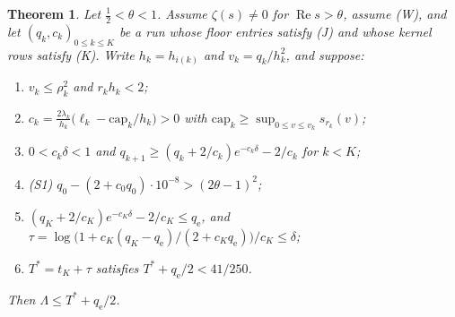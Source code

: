 \documentclass[11pt]{article}
\newtheorem{theorem}{Theorem}[section]
\theoremstyle{definition}
\newcommand{\LB}{\Lambda}
\newcommand{\capo}{\mathrm{cap}}
\newcommand{\qe}{q_{\mathrm e}}
\DeclareMathOperator{\Rea}{Re}
\begin{document}
\begin{theorem}\label{thm:barrier}
Let $\frac12<\theta<1$. Assume $\zeta(s)\ne0$ for $\Rea s>\theta$, assume \textup{(W)}, and
let $(q_k,c_k)_{0\le k\le K}$ be a run whose floor entries satisfy \textup{(J)} and whose
kernel rows satisfy \textup{(K)}. Write $h_k=h_{i(k)}$ and $v_k=q_k/h_k^2$, and suppose:
\begin{enumerate}[label=\textup{(C\arabic*)},leftmargin=3em]
\item $v_k\le\rho_k^2$ and $r_kh_k<2$;
\item $c_k=\frac{2\lambda_k}{h_k}\bigl(\ell_k-\capo_k/h_k\bigr)>0$ with
$\capo_k\ge\sup_{0\le v\le v_k}s_{r_k}(v)$;
\item $0<c_k\delta<1$ and $q_{k+1}\ge(q_k+2/c_k)e^{-c_k\delta}-2/c_k$ for $k<K$;
\item \textup{(S1)} $q_0-(2+c_0q_0)\cdot10^{-8}>(2\theta-1)^2$;
\item $(q_K+2/c_K)e^{-c_K\delta}-2/c_K\le\qe$, and
$\tau=\log\bigl(1+c_K(q_K-\qe)/(2+c_K\qe)\bigr)/c_K\le\delta$;
\item $T^*=t_K+\tau$ satisfies $T^*+\qe/2<41/250$.
\end{enumerate}
Then $\LB\le T^*+\qe/2$.
\end{theorem}
\end{document}
